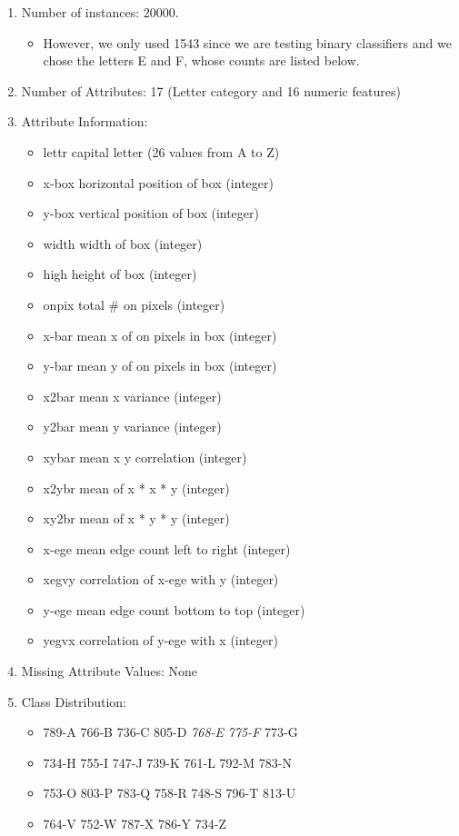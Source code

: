 \documentclass[12pt]{article}
\begin{document}
\begin{enumerate}
\begin{itemize}
    \end{itemize}
    \item Number of instances: 20000.
    \begin{itemize}
        \item However, we only used 1543 since we are testing binary classifiers and we chose the letters E and F, whose counts are listed below.
    \end{itemize}
    \item Number of Attributes: 17 (Letter category and 16 numeric features)
    \item Attribute Information:
    \begin{itemize}
        \item lettr	capital letter	(26 values from A to Z)
        \item x-box	horizontal position of box	  (integer)
        \item y-box	vertical position of box	  (integer)
        \item width	width of box			      (integer)
        \item high 	height of box			      (integer)
        \item onpix	total # on pixels		      (integer)
        \item x-bar	mean x of on pixels in box	  (integer)
        \item y-bar	mean y of on pixels in box	  (integer)
        \item x2bar	mean x variance			      (integer)
        \item y2bar	mean y variance			      (integer)
        \item xybar	mean x y correlation		  (integer)
        \item x2ybr	mean of x * x * y		      (integer)
        \item xy2br	mean of x * y * y		      (integer)
        \item x-ege	mean edge count left to right (integer)
        \item xegvy	correlation of x-ege with y	  (integer)
        \item y-ege	mean edge count bottom to top (integer)
        \item yegvx	correlation of y-ege with x	  (integer)
    \end{itemize}
    \item Missing Attribute Values: None
    \item Class Distribution:
    \begin{itemize}
        \item 789-A 766-B 736-C 805-D \emph{768-E} \emph{775-F} 773-G
        \item 734-H 755-I 747-J 739-K 761-L 792-M 783-N
        \item 753-O 803-P 783-Q 758-R 748-S 796-T 813-U
        \item 764-V 752-W 787-X 786-Y 734-Z
    \end{itemize}
\end{enumerate}
\end{document}
